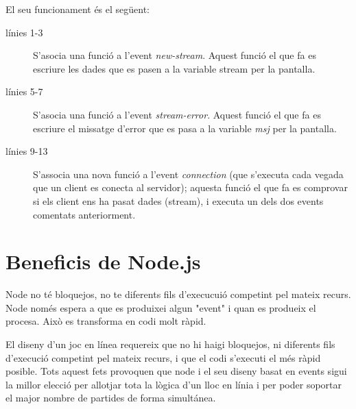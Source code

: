 El seu funcionament és el següent: 

\begin{description}
    \item[línies 1-3] {S'asocia una funció a l'event \emph{new-stream}. Aquest funció el que fa es escriure les dades que es pasen a la variable stream per la pantalla.}
    \item[línies 5-7] {S'asocia una funció a l'event \emph{stream-error}. Aquest funció el que fa es escriure el missatge d'error que es pasa a la variable \emph{msj} per la pantalla.}
  \item[línies 9-13] {S'associa una nova funció a l'event \emph{connection} (que s'executa cada vegada que un client es conecta al servidor); aquesta funció el que fa es comprovar si els client ens ha pasat dades (stream), i executa un dels dos events comentats anteriorment.}
\end{description}

\section{Beneficis de Node.js}

Node no té bloquejos, no te diferents fils d'execucuió competint pel mateix recurs. Node només espera a que es produixei algun "event" i quan es produeix el procesa. Això es transforma en codi molt ràpid.

El diseny d'un joc en línea requereix que no hi haigi bloquejos, ni diferents fils d'execució competint pel mateix recurs, i que el codi s'executi el més ràpid posible. Tots aquest fets provoquen que node i el seu diseny basat en events sigui la millor elecció per allotjar tota la lògica d'un lloc en línia i per poder soportar el major nombre de partides de forma simultánea.


